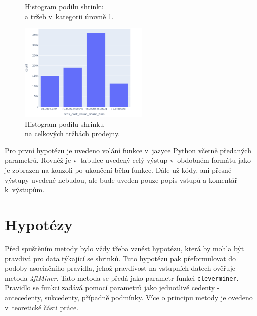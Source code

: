 \begin{figure}[h!]
\begin{minipage}[b]{.55\textwidth}
        \vspace*{-3em}
        \caption{Histogram podílu shrinku \\a tržeb v~kategorii úrovně 1.}
        \label{obr:nb:hist4}
    \end{minipage}     
       \vspace*{-1em}
\end{figure}

\begin{figure}[h!]
        \centering
        \captionsetup{justification=centering}
        \includegraphics[width=0.55\textwidth]{obrazky/grafy/histogram/newplot(4).png}
        \caption{Histogram podílu shrinku \\na celkových tržbách prodejny.}
        \label{obr:nb:hist5}
        \vspace*{-1em}
\end{figure}

Pro první hypotézu je uvedeno volání funkce v~jazyce Python včetně předaných parametrů. Rovněž je v~tabulce uvedený celý výstup v~obdobném formátu jako je zobrazen na konzoli po ukončení běhu funkce. Dále už kódy, ani přesné výstupy uvedené nebudou, ale bude uveden pouze popis vstupů a komentář k~výstupům. 

\section{Hypotézy}
\label{sec:hypo}
Před spuštěním metody bylo vždy třeba vznést hypotézu, která by mohla být pravdivá pro data týkající se shrinků. Tuto hypotézu pak přeformulovat do podoby asociačního pravidla, jehož pravdivost  na vstupních datech ověřuje metoda \emph{4ftMiner}. Tato metoda se předá jako parametr funkci \texttt{cleverminer}. Pravidlo se funkci zadává pomocí parametrů jako jednotlivé cedenty - antecedenty, sukcedenty, případně podmínky. Více o principu metody je ovedeno v~teoretické části práce.

\vspace*{1em}

